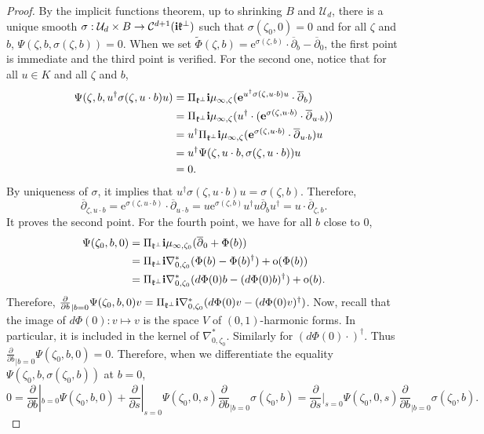 \documentclass{article}
\theoremstyle{remark}
\theoremstyle{definition}
\renewcommand{\i}{\boldsymbol{\mathrm{i}}}
\newcommand{\e}{\boldsymbol{\mathrm{e}}}
\newcommand{\mC}{\mathcal{C}}
\newcommand{\mU}{\mathcal{U}}
\newcommand{\dbar}{\overline{\partial}}
\begin{document}
\begin{proof}
By the implicit functions theorem, up to shrinking $B$ and $\mU_d$, there is a unique smooth $\sigma : \mU_d \times B \rightarrow \mC^{d + 1}(\i\frak{k}^\bot)$ such that $\sigma(\zeta_0,0) = 0$ and for all $\zeta$ and $b$, $\Psi(\zeta,b,\sigma(\zeta,b)) = 0$. When we set $\tilde{\Phi}(\zeta,b) = \e^{\sigma(\zeta,b)} \cdot \dbar_b - \dbar_0$, the first point is immediate and the third point is verified. For the second one, notice that for all $u \in K$ and all $\zeta$ and $b$,
\begin{align*}
    \Psi(\zeta,b,u^\dagger\sigma(\zeta,u \cdot b)u) & = \Pi_{\frak{k}^\bot}\i\mu_{\infty,\zeta}(\e^{u^\dagger\sigma(\zeta,u \cdot b)u} \cdot \dbar_b)\\
    & = \Pi_{\frak{k}^\bot}\i\mu_{\infty,\zeta}(u^\dagger \cdot (\e^{\sigma(\zeta,u \cdot b)} \cdot \dbar_{u \cdot b}))\\
    & = u^\dagger\Pi_{\frak{k}^\bot}\i\mu_{\infty,\zeta}(\e^{\sigma(\zeta,u \cdot b)} \cdot \dbar_{u \cdot b})u\\
    & = u^\dagger\Psi(\zeta,u \cdot b,\sigma(\zeta,u \cdot b))u\\
    & = 0.
\end{align*}
By uniqueness of $\sigma$, it implies that $u^\dagger\sigma(\zeta,u \cdot b)u = \sigma(\zeta,b)$. Therefore,
$$
\dbar_{\zeta,u \cdot b} = \e^{\sigma(\zeta,u \cdot b)} \cdot \dbar_{u \cdot b} = u\e^{\sigma(\zeta,b)}u^\dagger u\dbar_bu^\dagger = u \cdot \dbar_{\zeta,b}.
$$
It proves the second point. For the fourth point, we have for all $b$ close to $0$,
\begin{align*}
    \Psi(\zeta_0,b,0) & = \Pi_{\frak{k}^\bot}\i\mu_{\infty,\zeta_0}(\dbar_0 + \Phi(b))\\
    & = \Pi_{\frak{k}^\bot}\i\nabla_{0,\zeta_0}^*(\Phi(b) - \Phi(b)^\dagger) + \mathrm{o}(\Phi(b))\\
    & = \Pi_{\frak{k}^\bot}\i\nabla_{0,\zeta_0}^*(d\Phi(0)b - (d\Phi(0)b)^\dagger) + \mathrm{o}(b).
\end{align*}
Therefore, $\frac{\partial}{\partial b}_{|b = 0}\Psi(\zeta_0,b,0)v = \Pi_{\frak{k}^\bot}\i\nabla_{0,\zeta_0}^*(d\Phi(0)v - (d\Phi(0)v)^\dagger)$. Now, recall that the image of $d\Phi(0) : v \mapsto v$ is the space $V$ of $(0,1)$-harmonic forms. In particular, it is included in the kernel of $\nabla_{0,\zeta_0}^*$. Similarly for $(d\Phi(0)\cdot)^\dagger$. Thus $\frac{\partial}{\partial b}_{|b = 0}\Psi(\zeta_0,b,0) = 0$. Therefore, when we differentiate the equality $\Psi(\zeta_0,b,\sigma(\zeta_0,b))$ at $b = 0$,
$$
0 = \frac{\partial}{\partial b}|_{b = 0}\Psi(\zeta_0,b,0) + \frac{\partial}{\partial s}|_{s = 0}\Psi(\zeta_0,0,s)\frac{\partial}{\partial b}_{|b = 0}\sigma(\zeta_0,b) = \frac{\partial}{\partial s}|_{s = 0}\Psi(\zeta_0,0,s)\frac{\partial}{\partial b}_{|b = 0}\sigma(\zeta_0,b).
$$
\end{proof}
\end{document}
